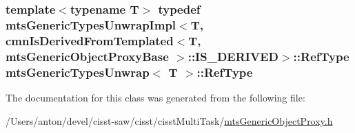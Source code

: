 \subsubsection[{Ref\+Type}]{\setlength{\rightskip}{0pt plus 5cm}template$<$typename T$>$ typedef {\bf mts\+Generic\+Types\+Unwrap\+Impl}$<$T, {\bf cmn\+Is\+Derived\+From\+Templated}$<$T, {\bf mts\+Generic\+Object\+Proxy\+Base} $>$\+::I\+S\+\_\+\+D\+E\+R\+I\+V\+E\+D$>$\+::{\bf Ref\+Type} {\bf mts\+Generic\+Types\+Unwrap}$<$ T $>$\+::{\bf Ref\+Type}}\label{classmts_generic_types_unwrap_a24e5f78383cd6567646fcdc413d02420}


The documentation for this class was generated from the following file\+:\begin{DoxyCompactItemize}
\item 
/\+Users/anton/devel/cisst-\/saw/cisst/cisst\+Multi\+Task/\hyperlink{mts_generic_object_proxy_8h}{mts\+Generic\+Object\+Proxy.\+h}\end{DoxyCompactItemize}
